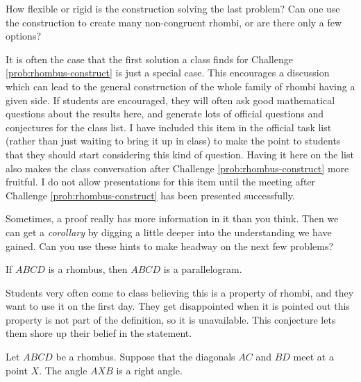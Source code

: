 \begin{question}\label{prob:rhombus-flexible}
How flexible or rigid is the construction solving the last problem?
Can one use the construction to create many non-congruent rhombi, or are there only a few options?
\end{question}

\begin{annotation}
{
\color{blue}
It is often the case that the first solution a class finds for Challenge \ref{prob:rhombus-construct} is just a special case.
This encourages a discussion which can lead to the general construction of the whole family of rhombi having a given side.
If students are encouraged, they will often ask good mathematical questions about the results here, and generate lots of official questions and conjectures for the class list. I have included this item in the official task list (rather than just waiting to bring it up in class) to make the point to students that they should start considering this kind of question. Having it here on the list also makes the class conversation after Challenge \ref{prob:rhombus-construct} more fruitful. I do not allow presentations for this item until the meeting after Challenge \ref{prob:rhombus-construct} has been presented successfully.
}
\end{annotation}

Sometimes, a proof really has more information in it than you think.
Then we can get a \emph{corollary} by digging a little deeper into the understanding we have gained.
Can you use these hints to make headway on the next few problems?

\begin{conjecture}\label{conj:rhombus-is-parallelogram}
If $ABCD$ is a rhombus, then $ABCD$ is a parallelogram.
\end{conjecture}

\begin{annotation}
{
\color{blue}
Students very often come to class believing this is a property of rhombi, and they want to use it on the first day.
They get disappointed when it is pointed out this property is not part of the definition, so it is unavailable.
This conjecture lets them shore up their belief in the statement.
}
\end{annotation}


\begin{conjecture}\label{conj:rhombus-diagonals-angle}
Let $ABCD$ be a rhombus. Suppose that the diagonals $AC$ and $BD$ meet at a point $X$.
The angle $AXB$ is a right angle.
\end{conjecture}

